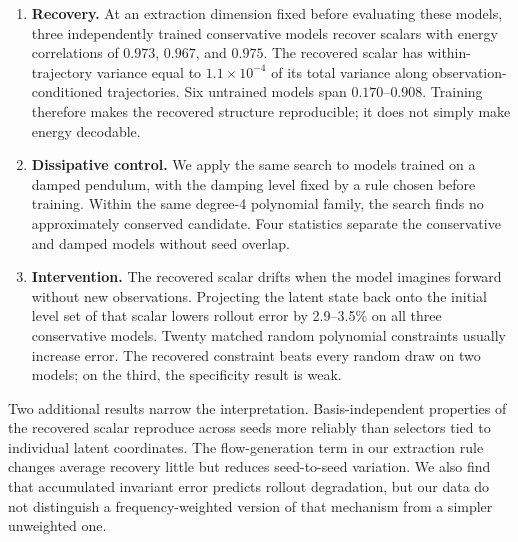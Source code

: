 \begin{enumerate}
\item \textbf{Recovery.} At an extraction dimension fixed before evaluating these models, three
independently trained conservative models recover scalars with energy correlations of $0.973$,
$0.967$, and $0.975$. The recovered scalar has within-trajectory variance equal to
$1.1\times10^{-4}$ of its total variance along observation-conditioned trajectories. Six untrained
models span $0.170$--$0.908$. Training therefore makes the recovered structure reproducible; it does
not simply make energy decodable.

\item \textbf{Dissipative control.} We apply the same search to models trained on a damped pendulum,
with the damping level fixed by a rule chosen before training. Within the same degree-4 polynomial
family, the search finds no approximately conserved candidate. Four statistics separate the
conservative and damped models without seed overlap.

\item \textbf{Intervention.} The recovered scalar drifts when the model imagines forward without new
observations. Projecting the latent state back onto the initial level set of that scalar lowers
rollout error by 2.9--3.5\% on all three conservative models. Twenty matched random polynomial
constraints usually increase error. The recovered constraint beats every random draw on two models;
on the third, the specificity result is weak.
\end{enumerate}

Two additional results narrow the interpretation. Basis-independent properties of the recovered
scalar reproduce across seeds more reliably than selectors tied to individual latent coordinates.
The flow-generation term in our extraction rule changes average recovery little but reduces
seed-to-seed variation. We also find that accumulated invariant error predicts rollout degradation,
but our data do not distinguish a frequency-weighted version of that mechanism from a simpler
unweighted one.
